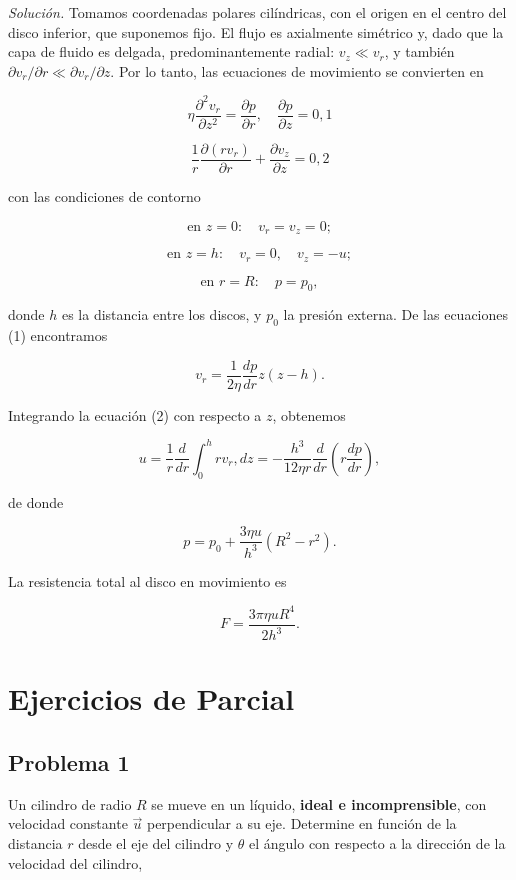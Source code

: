 \documentclass{article}
\begin{document}
\textit{Solución.} Tomamos coordenadas polares cilíndricas, con el origen en el centro del disco inferior, que suponemos fijo. El flujo es axialmente simétrico y, dado que la capa de fluido es delgada, predominantemente radial: $v_z \ll v_r$, y también $\partial v_r/\partial r \ll \partial v_r/\partial z$. Por lo tanto, las ecuaciones de movimiento se convierten en

$$
\eta \frac{\partial^2 v_r}{\partial z^2} = \frac{\partial p}{\partial r}, \quad \frac{\partial p}{\partial z} = 0, {1}
$$

$$
\frac{1}{r} \frac{\partial (rv_r)}{\partial r} + \frac{\partial v_z}{\partial z} = 0, {2}
$$

con las condiciones de contorno

$$
\text{en } z = 0: \quad v_r = v_z = 0;
$$

$$
\text{en } z = h: \quad v_r = 0, \quad v_z = -u;
$$

$$
\text{en } r = R: \quad p = p_0,
$$

donde $h$ es la distancia entre los discos, y $p_0$ la presión externa. De las ecuaciones (1) encontramos

$$
v_r = \frac{1}{2\eta} \frac{dp}{dr} z(z - h).
$$

Integrando la ecuación (2) con respecto a $z$, obtenemos

$$
u = \frac{1}{r} \frac{d}{dr} \int_0^h rv_r , dz = -\frac{h^3}{12\eta r} \frac{d}{dr} \left( r \frac{dp}{dr} \right),
$$

de donde

$$
p = p_0 + \frac{3\eta u}{h^3} (R^2 - r^2).
$$

La resistencia total al disco en movimiento es

$$
F = \frac{3\pi \eta u R^4}{2h^3}.
$$

\section*{Ejercicios de Parcial}

\subsection*{Problema 1}

Un cilindro de radio $R$ se mueve en un líquido, \textbf{ideal e incomprensible}, con velocidad constante $\vec{u}$ perpendicular a su eje. Determine en función de la distancia $r$ desde el eje del cilindro y $\theta$ el ángulo con respecto a la dirección de la velocidad del cilindro,
\end{document}
